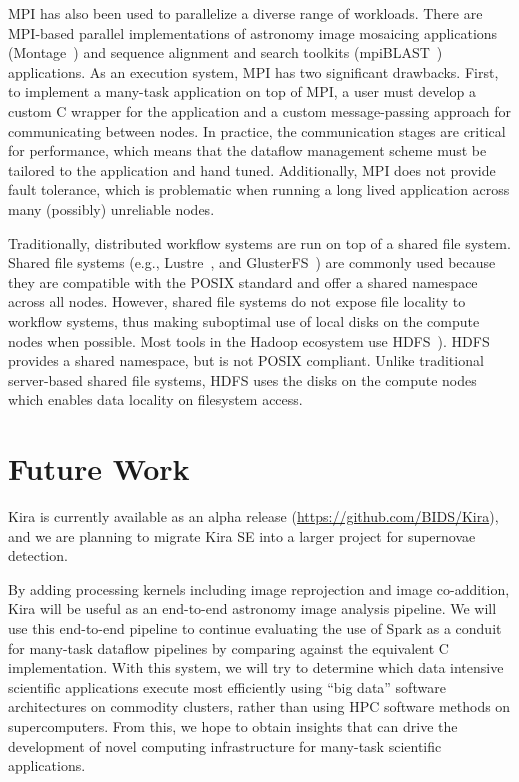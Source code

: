 \documentclass[10pt,journal,compsoc]{IEEEtran}
\begin{document}
MPI has also been used to parallelize a diverse range of workloads. There
are MPI-based parallel implementations of astronomy image
mosaicing applications (Montage~\cite{jacob09}) and
sequence alignment and search toolkits (mpiBLAST~\cite{lin08}) applications. As an
execution system, MPI has two significant drawbacks. First, to implement a many-task
application on top of MPI, a user must develop a custom C wrapper for the application
and a custom message-passing approach for communicating between nodes. In practice, the
communication stages are critical for performance, which means that the
dataflow management scheme must be tailored to the application and hand tuned. Additionally,
MPI does not provide fault tolerance, which is problematic when running a long lived
application across many (possibly) unreliable nodes.

Traditionally, distributed workflow systems are run on top of a shared file system. 
Shared file systems (e.g., Lustre~\cite{donovan03}, and
GlusterFS~\cite{davies13}) are commonly used because they are compatible with the POSIX
standard and offer a shared namespace across all nodes. However, shared file systems
do not expose file locality to workflow systems, thus making suboptimal use of local
disks on the compute nodes when possible. Most tools in the Hadoop ecosystem use
HDFS~\cite{shvachko10}). HDFS  provides a shared namespace, but is not POSIX
compliant. Unlike traditional server-based shared file systems, HDFS uses
the disks on the compute nodes which enables data locality on filesystem access.

\section{Future Work}
\label{sec:Future}
Kira is currently available as an alpha release (\url{https://github.com/BIDS/Kira}), 
and we are planning to migrate Kira SE into a larger project for supernovae detection.

By adding processing kernels including image reprojection and image co-addition, Kira will be
useful as an end-to-end astronomy image analysis pipeline. We will use this end-to-end pipeline
to continue evaluating the use of Spark as a conduit for many-task dataflow pipelines by
comparing against the equivalent C implementation. With this system, we will try to determine
which data intensive scientific applications execute most efficiently using ``big data''
software architectures on commodity clusters, rather than using HPC software methods on supercomputers.
From this, we hope to obtain insights that can drive the development of novel computing
infrastructure for many-task scientific applications.
\end{document}
